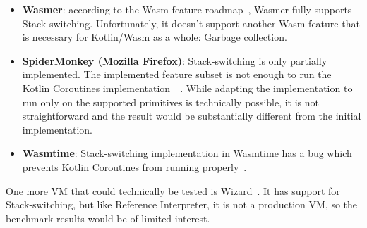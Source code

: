 \begin{itemize}
    \item \textbf{Wasmer}: according to the Wasm feature roadmap~\cite{wasm-features}, Wasmer fully supports
    Stack-switching. Unfortunately, it doesn't support another Wasm feature that is necessary for Kotlin/Wasm as a
    whole: Garbage collection.
    \item \textbf{SpiderMonkey (Mozilla Firefox)}: Stack-switching is only partially implemented. The implemented
    feature subset is not enough to run the Kotlin Coroutines implementation~~\cite{spidermonkey-stack-switching,spidermonkey-stack-switching-diff}. While adapting the implementation to run
    only on the supported primitives is technically possible, it is not straightforward and the result would be substantially
    different from the initial implementation.
    \item \textbf{Wasmtime}: Stack-switching implementation in Wasmtime has a bug which prevents Kotlin Coroutines from running properly~\cite{wasmtime-stack-switching-bug}.
\end{itemize}

One more VM that could technically be tested is Wizard~\cite{wizard-engine}. It has support for Stack-switching, but like
Reference Interpreter, it is not a production VM, so the benchmark results would be of limited interest.